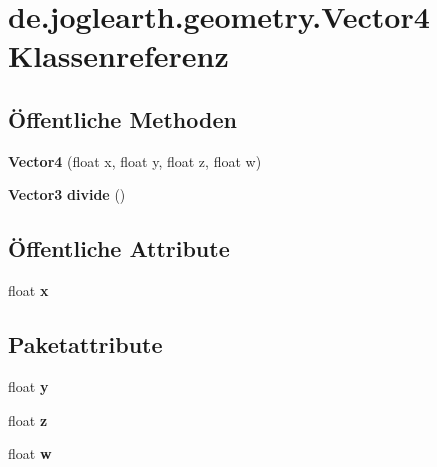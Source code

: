 \section{de.\-joglearth.\-geometry.\-Vector4 \-Klassenreferenz}
\label{classde_1_1joglearth_1_1geometry_1_1_vector4}
\subsection*{Öffentliche \-Methoden}
\begin{DoxyCompactItemize}
\item 
{\bfseries \-Vector4} (float x, float y, float z, float w)\label{classde_1_1joglearth_1_1geometry_1_1_vector4_a70db9638f6e7aa161eea017b1b795af9}

\item 
{\bf \-Vector3} {\bfseries divide} ()\label{classde_1_1joglearth_1_1geometry_1_1_vector4_a9c46bb2498e82e0b2a28a8bad0406bb1}

\end{DoxyCompactItemize}
\subsection*{Öffentliche \-Attribute}
\begin{DoxyCompactItemize}
\item 
float {\bfseries x}\label{classde_1_1joglearth_1_1geometry_1_1_vector4_a1b56f77e0d2e295f9fd3259705107c7c}

\end{DoxyCompactItemize}
\subsection*{\-Paketattribute}
\begin{DoxyCompactItemize}
\item 
float {\bfseries y}\label{classde_1_1joglearth_1_1geometry_1_1_vector4_a9637bde8c62a67d4b24b56761ae0f6f2}

\item 
float {\bfseries z}\label{classde_1_1joglearth_1_1geometry_1_1_vector4_ac7a5598153c65122ba42472860e1b3cf}

\item 
float {\bfseries w}\label{classde_1_1joglearth_1_1geometry_1_1_vector4_a80253bf7fc562fae37811a83a583bc08}

\end{DoxyCompactItemize}
